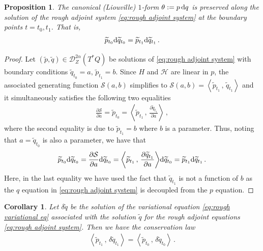 \documentclass[11pt, oneside]{article}
\numberwithin{equation}{section}
\newtheorem{corollary}[lemma]{Corollary}
\newtheorem{proposition}[lemma]{Proposition}
\theoremstyle{definition}
\newcommand{\wt}[1]{\widetilde{#1}}
\newcommand{\mc}[1]{\mathcal{#1}}
\newcommand{\mcal}[1]{\mc{#1}}
\newcommand{\scp}[2]{{\left\langle {#1}\, , \, {#2}\right\rangle}}
\def\p{{\partial}}
\def\rmd{{\rm d}}
\def\p{\partial}
\begin{document}
\begin{proposition}\label{prop:canonical one form conservation}
    The canonical (Liouville) $1$-form $\theta := p\,\rmd q$ is preserved along the solution of the rough adjoint system \eqref{eq:rough adjoint system} at the boundary points $t = t_0, t_1$. That is,
    \begin{align}
        \wt{p}_{t_0}\rmd \wt{q}_{t_0} = \wt{p}_{t_1}\rmd \wt{q}_{t_1}\,.
    \end{align}
\end{proposition}
\begin{proof}
    Let $(\wt{p}, \wt{q}) \in \mcal{D}^{2\alpha}_Z(T^*Q)$ be solutions of \eqref{eq:rough adjoint system} with boundary conditions $\wt{q}_{t_0} = a,\, \wt{p}_{t_1} = b$. Since $H$ and $\mcal{H}$ are linear in $p$, the associated generating function $\mcal{S}(a,b)$ simplifies to $\mcal{S}(a,b) = \scp{\wt{p}_{t_1}}{\wt{q}_{t_1}}$ and it simultaneously satisfies the following two equalities
    \begin{align*}
        \frac{\p \mcal{S}}{\p a} = \wt{p}_{t_0} = \scp{\wt{p}_{t_1}}{\frac{\p \wt{q}_{t_1}}{\p a}} \,,
    \end{align*}
    where the second equality is due to $\wt{p}_{t_1} = b$ where $b$ is a parameter.  Thus, noting that $a = \wt{q}_{t_0}$ is also a parameter, we have that
    \begin{align*}
        \wt{p}_{t_0}\rmd \wt{q}_{t_0} = \frac{\p \mathcal{S}}{\p a}\rmd \wt{q}_{t_0} = \scp{\wt{p}_{t_1}}{\frac{\p \wt{q}_{t_1}}{\p a}}\rmd \wt{q}_{t_0} = \wt{p}_{t_1}\rmd \wt{q}_{t_1}\,.
    \end{align*}
    Here, in the last equality we have used the fact that $\wt{q}_{t_1}$ is not a function of $b$ as the $q$ equation in \eqref{eq:rough adjoint system} is decoupled from the $p$ equation.
\end{proof}
\begin{corollary}
    Let $\delta \wt{q}$ be the solution of the variational equation \eqref{eq:rough variational eq} associated with the solution $\wt{q}$ for the rough adjoint equations \eqref{eq:rough adjoint system}. Then we have the conservation law
    \begin{align}
        \scp{\wt{p}_{t_1}}{\delta \wt{q}_{t_1}} = \scp{\wt{p}_{t_0}}{\delta \wt{q}_{t_0}}\,. \label{eq:1-form inner prod conservation}
    \end{align}
\end{corollary}
\end{document}
